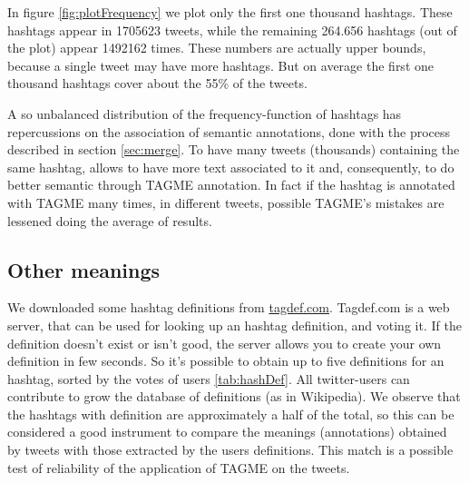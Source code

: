 \documentclass[a4paper,11pt,oneside]{article}
\begin{document}
In figure \ref{fig:plotFrequency} we plot only the first one thousand hashtags. These hashtags appear in 1705623 tweets, while the remaining 264.656 hashtags (out of the plot) appear 1492162 times.
These numbers are actually upper bounds, because a single tweet may have more hashtags. But on average the first one thousand hashtags cover about the 55\% of the tweets.

A so unbalanced distribution of the frequency-function of hashtags has repercussions on the association of semantic annotations, done with the process described in section \ref{sec:merge}.
To have many tweets (thousands) containing the same hashtag, allows to have more text associated to it and, consequently, to do better semantic through TAGME annotation.
In fact if the hashtag is annotated with TAGME many times, in different tweets, possible TAGME's mistakes are lessened doing the average of results.



\subsection{Other meanings}
We downloaded some hashtag definitions from \href{http://tagdef.com/}{tagdef.com}. Tagdef.com is a web server, that can be used for looking up an hashtag definition, and voting it.
If the definition doesn't exist or isn't good, the server allows you to create your own definition in few seconds. So it's possible to obtain up to five definitions for an hashtag, sorted by the votes of users \ref{tab:hashDef}. All twitter-users can contribute to grow the database of definitions (as in Wikipedia).
We observe that the hashtags with definition are approximately a half of the total, so this can be considered a good instrument to compare the meanings (annotations) obtained by tweets with those extracted by the users definitions.
This match is a possible test of reliability of the application of TAGME on the tweets. %
\end{document}
